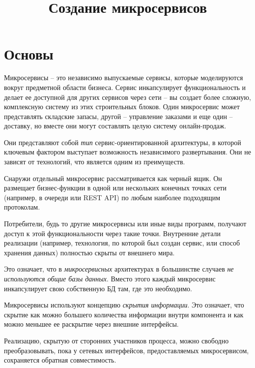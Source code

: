 \documentclass[%
	11pt,
	a4paper,
	utf8,
		]{article}
\begin{document}
\title{Создание микросервисов}

\author{}

\date{}
\maketitle

\thispagestyle{fancy}

\tableofcontents

\section{Основы}

Микросервисы -- это независимо выпускаемые сервисы, которые моделируются вокруг предметной области бизнеса. Сервис инкапсулирует функциональность и делает ее доступной для других сервисов через сети -- вы создает более сложную, комплексную систему из этих строительных блоков. Один микросервис может представлять складские запасы, другой -- управление заказами и еще один -- доставку, но вместе они могут составлять целую систему онлайн-продаж.

Они представляют собой \emph{тип} сервис-ориентированной архитектуры, в которой ключевым фактором выступает возможность независимого развертывания. Они не зависят от технологий, что является одним из преимуществ.

Снаружи отдельный микросервис рассматривается как черный ящик. Он размещает бизнес-функции в одной или нескольких конечных точках сети (например, в очереди или REST API) по любым наиболее подходящим протоколам.

Потребители, будь то другие микросервисы или иные виды программ, получают доступ к этой функциональности через такие точки. Внутренние детали реализации (например, технология, по которой был создан сервис, или способ хранения данных) полностью скрыты от внешнего мира.

Это означает, что в \emph{микросервисных} архитектурах в большинстве случаев \emph{не используются общие базы данных}. Вместо этого каждый микросервис инкапсулирует свою собственную БД там, где это необходимо.

Микросервисы используют концепцию \emph{скрытия информации}. Это означает, что скрытие как можно большего количества информации внутри компонента и как можно меньшее ее раскрытие через внешние интерфейсы. 

Реализацию, скрытую от сторонних участников процесса, можно свободно преобразовывать, пока у сетевых интерфейсов, предоставляемых микросервисом, сохраняется обратная совместимость. 
\end{document}

